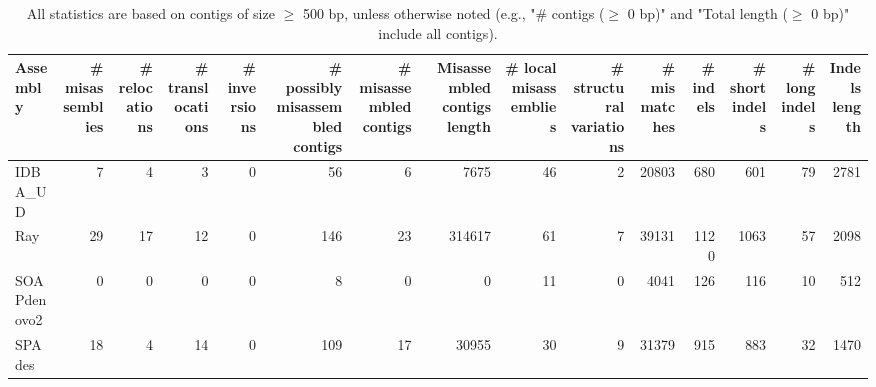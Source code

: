 \documentclass[12pt,a4paper]{article}
\begin{document}
\begin{table}[ht]
\begin{center}
\caption{All statistics are based on contigs of size $\geq$ 500 bp, unless otherwise noted (e.g., "\# contigs ($\geq$ 0 bp)" and "Total length ($\geq$ 0 bp)" include all contigs).}
\begin{tabular}{|l*{14}{|r}|}
\hline
Assembly & \# misassemblies &     \# relocations &     \# translocations &     \# inversions & \# possibly misassembled contigs & \# misassembled contigs & Misassembled contigs length & \# local misassemblies & \# structural variations & \# mismatches & \# indels &     \# short indels &     \# long indels & Indels length \\ \hline
IDBA\_UD & 7 & 4 & 3 & 0 & 56 & 6 & 7675 & 46 & 2 & 20803 & 680 & 601 & 79 & 2781 \\ \hline
Ray & 29 & 17 & 12 & 0 & 146 & 23 & 314617 & 61 & 7 & 39131 & 1120 & 1063 & 57 & 2098 \\ \hline
SOAPdenovo2 & 0 & 0 & 0 & 0 & 8 & 0 & 0 & 11 & 0 & 4041 & 126 & 116 & 10 & 512 \\ \hline
SPAdes & 18 & 4 & 14 & 0 & 109 & 17 & 30955 & 30 & 9 & 31379 & 915 & 883 & 32 & 1470 \\ \hline
\end{tabular}
\end{center}
\end{table}
\end{document}
